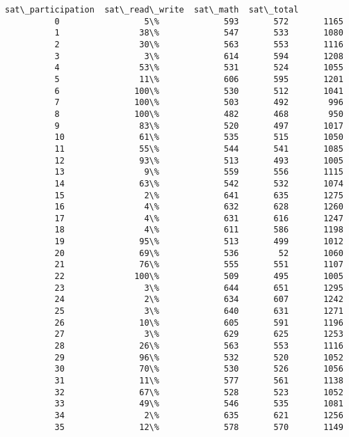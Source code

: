 \documentclass[11pt]{article}
\begin{document}
\begin{Verbatim}[commandchars=\\\{\}]
             sat\_participation  sat\_read\_write  sat\_math  sat\_total  
          0                 5\%             593       572       1165  
          1                38\%             547       533       1080  
          2                30\%             563       553       1116  
          3                 3\%             614       594       1208  
          4                53\%             531       524       1055  
          5                11\%             606       595       1201  
          6               100\%             530       512       1041  
          7               100\%             503       492        996  
          8               100\%             482       468        950  
          9                83\%             520       497       1017  
          10               61\%             535       515       1050  
          11               55\%             544       541       1085  
          12               93\%             513       493       1005  
          13                9\%             559       556       1115  
          14               63\%             542       532       1074  
          15                2\%             641       635       1275  
          16                4\%             632       628       1260  
          17                4\%             631       616       1247  
          18                4\%             611       586       1198  
          19               95\%             513       499       1012  
          20               69\%             536        52       1060  
          21               76\%             555       551       1107  
          22              100\%             509       495       1005  
          23                3\%             644       651       1295  
          24                2\%             634       607       1242  
          25                3\%             640       631       1271  
          26               10\%             605       591       1196  
          27                3\%             629       625       1253  
          28               26\%             563       553       1116  
          29               96\%             532       520       1052  
          30               70\%             530       526       1056  
          31               11\%             577       561       1138  
          32               67\%             528       523       1052  
          33               49\%             546       535       1081  
          34                2\%             635       621       1256  
          35               12\%             578       570       1149  

\end{Verbatim}
\end{document}

